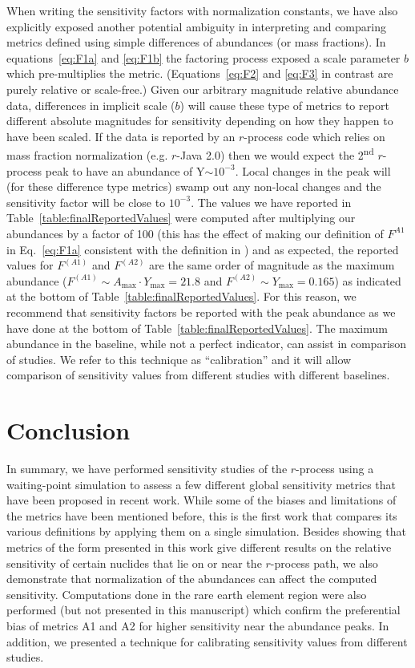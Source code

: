 \documentclass[aps,prc,reprint,showpacs,floatfix,nofootinbib]{revtex4-1}
\begin{document}
When writing the sensitivity factors with normalization constants, we have also explicitly exposed another potential ambiguity 
in interpreting and comparing metrics defined using simple differences of abundances (or mass fractions). 
In equations~\ref{eq:F1a} and \ref{eq:F1b} the factoring process exposed a scale parameter $b$ which pre-multiplies the 
metric. (Equations~\ref{eq:F2} and \ref{eq:F3} in contrast are purely relative or scale-free.) 
Given our arbitrary magnitude relative abundance data, differences in implicit scale ($b$) will 
cause these type of metrics to report different absolute magnitudes for sensitivity depending on 
how they happen to have been scaled. If the data is reported by an $r$-process code which relies on mass fraction normalization 
(e.g. $r$-Java 2.0) then we would expect the 2\textsuperscript{nd} $r$-process peak to have an abundance of Y$\sim10^{-3}$. 
Local changes in the peak will (for these difference type metrics) swamp out any non-local changes and the sensitivity factor 
will be close to $10^{-3}$. The values we have reported in Table~\ref{table:finalReportedValues} were computed after multiplying 
our abundances by a factor of 100 (this has the effect of making our definition of 
$F^{A1}$ in Eq.~\ref{eq:F1a} consistent with the definition in \cite{2015PhRvC..92c5807M}) and as expected, 
the reported values for $F^{(A1)}$ and $F^{(A2)}$ are the same order of magnitude as the maximum abundance
($F^{(A1)}\sim A_\textrm{max}\cdot Y_\textrm{max} = 21.8$ and $F^{(A2)}\sim Y_\textrm{max} =0.165$) as indicated 
at the bottom of Table~\ref{table:finalReportedValues}. For this reason, we recommend  
that sensitivity factors be reported with the peak abundance as we have done at the bottom of Table~\ref{table:finalReportedValues}.
The maximum abundance in the baseline, while not a perfect indicator, can 
assist in comparison of studies. 
We refer to this technique as ``calibration'' and it will allow comparison of sensitivity values from different 
studies with different baselines.


\section{Conclusion}
\label{sec:conclude}
In summary, we have performed sensitivity studies of the $r$-process using a waiting-point simulation to assess a few different global sensitivity metrics that have been proposed in recent work. While some of the biases and limitations of the metrics have been mentioned before, this is the first work that compares its various definitions by applying them on a single simulation. Besides showing that metrics of the form presented in this work give different results on the relative sensitivity of certain nuclides that lie on or near the $r$-process path, we also demonstrate that normalization of the abundances can affect the computed sensitivity. Computations done in the rare earth element region were also performed (but not presented in this manuscript) 
which confirm the preferential bias of metrics A1 and A2 for higher sensitivity near the abundance peaks. In addition, 
we presented a technique for calibrating sensitivity values from different studies. 
\end{document}
